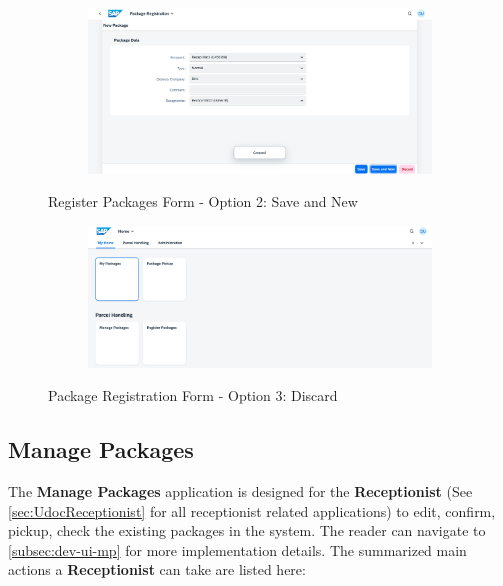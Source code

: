 \begin{figure}[htb!]
	\centering
    \begin{subfigure}{0.95\linewidth}
        \centering
        \includegraphics[width=1\linewidth]{images/user_doc/registration/saveAndNewToast.png}
    \end{subfigure}
    \caption{Register Packages Form - Option 2: Save and New}
    \label{fig:RPsaveNewOp}
\end{figure}

\begin{figure}[H]
	\centering
    \begin{subfigure}{0.95\linewidth}
        \centering
        \includegraphics[width=1\linewidth]{images/user_doc/registration/discardTarget.png}
    \end{subfigure}
    \caption{Package Registration Form - Option 3: Discard}
    \label{fig:RPdiscardOp}
\end{figure}

\bigskip
\subsection{Manage Packages}                     
\label{subsec:mp}

The \textbf{Manage Packages} application is designed for the \textbf{Receptionist} (See \autoref{sec:UdocReceptionist} for all receptionist related applications) to edit, confirm, pickup, check the existing packages in the system. The reader can navigate to \autoref{subsec:dev-ui-mp} for more implementation details. The summarized main actions a \textbf{Receptionist} can take are listed here:

